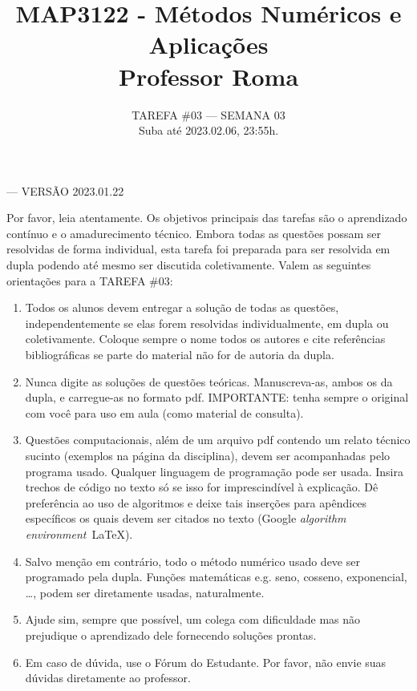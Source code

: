 \documentclass{article}
\title{MAP3122 - Métodos Numéricos e Aplicações\\ Professor Roma\\ }
\author{TAREFA \#03 --- SEMANA 03\\ Suba até 2023.02.06, 23:55h.}
\date{}
\begin{document}
\maketitle


    \vspace{-3mm}
    
    \mbox{}\hfill  --- VERSÃO 2023.01.22

\vspace{3mm}

Por favor, leia atentamente. Os objetivos principais das tarefas são o aprendizado contínuo e o amadurecimento técnico.
Embora todas as questões  possam ser resolvidas de forma individual, esta tarefa foi preparada para ser resolvida em dupla podendo até mesmo ser discutida coletivamente. Valem as seguintes orientações para a TAREFA \#03:

\begin{enumerate}
 
 \item Todos os alunos devem entregar a solução de todas as questões, independentemente se elas forem resolvidas individualmente, em dupla ou coletivamente. Coloque sempre o nome todos os autores e cite referências bibliográficas se parte do material não for de autoria da dupla. 
 \item Nunca digite as soluções de questões teóricas. Manuscreva-as, ambos os da dupla, e carregue-as no  formato pdf. IMPORTANTE: tenha sempre o original com você para uso em aula (como material de consulta).
 \item Questões computacionais, além de um arquivo pdf contendo um relato técnico sucinto (exemplos na página da disciplina), devem ser acom\-panha\-das pelo programa usado. Qualquer linguagem de programação pode ser usada. Insira trechos de código no texto só se isso for imprescindível à explicação. Dê preferência ao uso de algoritmos e deixe tais inserções para apêndices específicos os quais devem ser citados no texto (Google {\it algorithm environment}\, \LaTeX).
 \item Salvo menção em contrário, todo o método numérico usado deve ser programado pela dupla. Funções matemáticas e.g. seno, cosseno, exponencial, \dots, podem ser diretamente usadas, naturalmente.
 \item Ajude sim, sempre que possível, um colega com dificuldade mas  não preju\-dique o aprendizado dele fornecendo soluções prontas.
 \item Em caso de dúvida, use o Fórum do Estudante. Por favor, não envie suas dúvidas diretamente ao professor.
\end{enumerate}
\end{document}
